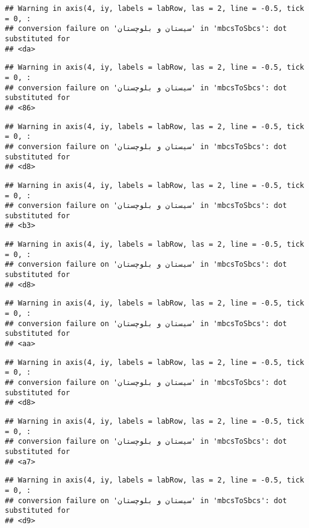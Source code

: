 \documentclass[
]{article}
\begin{document}
\begin{verbatim}
## Warning in axis(4, iy, labels = labRow, las = 2, line = -0.5, tick = 0, :
## conversion failure on 'سیستان و بلوچستان' in 'mbcsToSbcs': dot substituted for
## <da>
\end{verbatim}

\begin{verbatim}
## Warning in axis(4, iy, labels = labRow, las = 2, line = -0.5, tick = 0, :
## conversion failure on 'سیستان و بلوچستان' in 'mbcsToSbcs': dot substituted for
## <86>
\end{verbatim}

\begin{verbatim}
## Warning in axis(4, iy, labels = labRow, las = 2, line = -0.5, tick = 0, :
## conversion failure on 'سیستان و بلوچستان' in 'mbcsToSbcs': dot substituted for
## <d8>
\end{verbatim}

\begin{verbatim}
## Warning in axis(4, iy, labels = labRow, las = 2, line = -0.5, tick = 0, :
## conversion failure on 'سیستان و بلوچستان' in 'mbcsToSbcs': dot substituted for
## <b3>
\end{verbatim}

\begin{verbatim}
## Warning in axis(4, iy, labels = labRow, las = 2, line = -0.5, tick = 0, :
## conversion failure on 'سیستان و بلوچستان' in 'mbcsToSbcs': dot substituted for
## <d8>
\end{verbatim}

\begin{verbatim}
## Warning in axis(4, iy, labels = labRow, las = 2, line = -0.5, tick = 0, :
## conversion failure on 'سیستان و بلوچستان' in 'mbcsToSbcs': dot substituted for
## <aa>
\end{verbatim}

\begin{verbatim}
## Warning in axis(4, iy, labels = labRow, las = 2, line = -0.5, tick = 0, :
## conversion failure on 'سیستان و بلوچستان' in 'mbcsToSbcs': dot substituted for
## <d8>
\end{verbatim}

\begin{verbatim}
## Warning in axis(4, iy, labels = labRow, las = 2, line = -0.5, tick = 0, :
## conversion failure on 'سیستان و بلوچستان' in 'mbcsToSbcs': dot substituted for
## <a7>
\end{verbatim}

\begin{verbatim}
## Warning in axis(4, iy, labels = labRow, las = 2, line = -0.5, tick = 0, :
## conversion failure on 'سیستان و بلوچستان' in 'mbcsToSbcs': dot substituted for
## <d9>
\end{verbatim}
\end{document}

